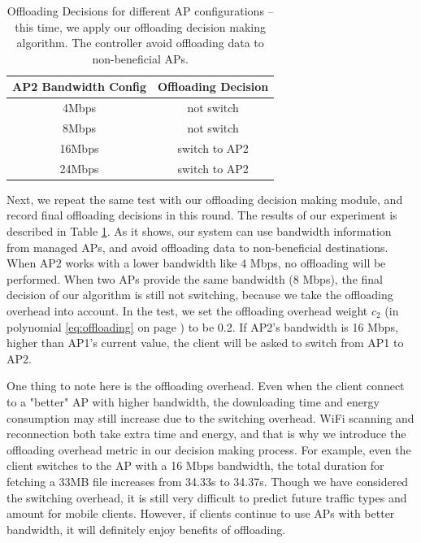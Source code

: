 \documentclass[english]{tktltiki}
\begin{document}
\begin{table}
  \centering
  \begin{tabular}{|c|c|}
    \hline
    AP2 Bandwidth Config & Offloading Decision \\
    \hline
    4Mbps & not switch \\
    \hline 
    8Mbps & not switch \\
    \hline 
    16Mbps & switch to AP2 \\
    \hline 
    24Mbps & switch to AP2 \\    
    \hline
  \end{tabular}
  \caption{Offloading Decisions for different AP configurations -- this time, we apply our offloading decision making algorithm. The controller avoid offloading data to non-beneficial APs.}
  \label{tab:decisions}
\end{table}

Next, we repeat the same test with our offloading decision making module, and record final offloading decisions in this round. The results of our experiment is described in Table \ref{tab:decisions}. As it shows, our system can use bandwidth information from managed APs, and avoid offloading data to non-beneficial destinations. When AP2 works with a lower bandwidth like 4 Mbps, no offloading will be performed. When two APs provide the same bandwidth (8 Mbps), the final decision of our algorithm is still not switching, because we take the offloading overhead into account. In the test, we set the offloading overhead weight $c_2$ (in polynomial \ref{eq:offloading} on page \pageref{eq:offloading}) to be 0.2. If AP2's bandwidth is 16 Mbps, higher than AP1's current value, the client will be asked to switch from AP1 to AP2.

One thing to note here is the offloading overhead. Even when the client connect to a "better" AP with higher bandwidth, the downloading time and energy consumption may still increase due to the switching overhead. WiFi scanning and reconnection both take extra time and energy, and that is why we introduce the offloading overhead metric in our decision making process. For example, even the client switches to the AP with a 16 Mbps bandwidth, the total duration for fetching a 33MB file increases from 34.33s to 34.37s. Though we have considered the switching overhead, it is still very difficult to predict future traffic types and amount for mobile clients. However, if clients continue to use APs with better bandwidth, it will definitely enjoy benefits of offloading.
\end{document}

